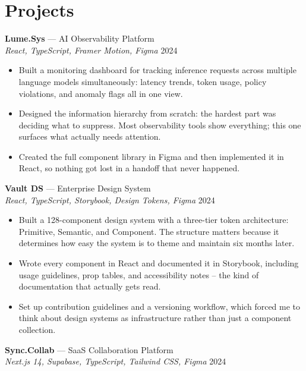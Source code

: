\documentclass[11pt, letterpaper]{article}
\begin{document}
\section{Projects}

\textbf{Lume.Sys} — AI Observability Platform\\
\textit{React, TypeScript, Framer Motion, Figma} \hfill 2024

\begin{itemize}
  \item Built a monitoring dashboard for tracking inference requests across
        multiple language models simultaneously: latency trends, token
        usage, policy violations, and anomaly flags all in one view.
  \item Designed the information hierarchy from scratch: the hardest part
        was deciding what to suppress. Most observability tools show
        everything; this one surfaces what actually needs attention.
  \item Created the full component library in Figma and then implemented
        it in React, so nothing got lost in a handoff that never happened.
\end{itemize}

\vspace{5pt}
\textbf{Vault DS} — Enterprise Design System\\
\textit{React, TypeScript, Storybook, Design Tokens, Figma} \hfill 2024

\begin{itemize}
  \item Built a 128-component design system with a three-tier token
        architecture: Primitive, Semantic, and Component. The structure
        matters because it determines how easy the system is to theme
        and maintain six months later.
  \item Wrote every component in React and documented it in Storybook,
        including usage guidelines, prop tables, and accessibility notes
        -- the kind of documentation that actually gets read.
  \item Set up contribution guidelines and a versioning workflow, which
        forced me to think about design systems as infrastructure rather
        than just a component collection.
\end{itemize}

\vspace{5pt}
\textbf{Sync.Collab} — SaaS Collaboration Platform\\
\textit{Next.js 14, Supabase, TypeScript, Tailwind CSS, Figma} \hfill 2024
\end{document}
